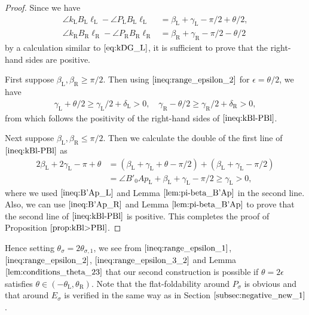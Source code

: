 \documentclass[11pt]{amsart}
\numberwithin{equation}{section}
\numberwithin{theorem}{section}
\newcommand{\Lt}{\ensuremath{\mathrm{L}}}
\newcommand{\Rt}{\ensuremath{\mathrm{R}}}
\begin{document}
\begin{proof}
Since we have
\begin{equation}\label{ineq:kBl-PBl}
\begin{aligned}
\angle k_\Lt B_\Lt\ell_\Lt -\angle P_\Lt B_\Lt\ell_\Lt&=\beta_\Lt +\gamma_\Lt -\pi /2+\theta /2,\\
\angle k_\Rt B_\Rt\ell_\Rt -\angle P_\Rt B_\Rt\ell_\Rt&=\beta_\Rt +\gamma_\Rt -\pi /2-\theta /2
\end{aligned}
\end{equation}
by a calculation similar to $\eqref{eq:kDG_L}$, it is sufficient to prove that the right-hand sides are positive.

First suppose $\beta_\Lt ,\beta_\Rt\geqslant\pi /2$.
Then using $\eqref{ineq:range_epsilon_2}$ for $\epsilon =\theta /2$, we have
\begin{align*}
\gamma_\Lt +\theta /2\geqslant\gamma_\Lt /2+\delta_\Lt >0,\quad\gamma_\Rt -\theta /2\geqslant\gamma_\Rt /2+\delta_\Rt >0,
\end{align*}
from which follows the positivity of the right-hand sides of $\eqref{ineq:kBl-PBl}$.

Next suppose $\beta_\Lt ,\beta_\Rt\leqslant\pi /2$.
Then we calculate the double of the first line of $\eqref{ineq:kBl-PBl}$ as
\begin{align*}
2\beta_\Lt +2\gamma_\Lt -\pi +\theta&=(\beta_\Lt +\gamma_\Lt +\theta -\pi /2)+(\beta_\Lt +\gamma_\Lt -\pi /2)\\
&=\angle B'_0Ap_\Lt +\beta_\Lt +\gamma_\Lt -\pi /2\geqslant\gamma_\Lt >0,
\end{align*}
where we used $\eqref{ineq:B'Ap_L}$ and Lemma $\ref{lem:pi-beta_B'Ap}$ in the second line.
Also, we can use $\eqref{ineq:B'Ap_R}$ and Lemma $\ref{lem:pi-beta_B'Ap}$ to prove that the second line of $\eqref{ineq:kBl-PBl}$ is positive.
This completes the proof of Proposition $\ref{prop:kBl>PBl}$.
\end{proof}
Hence setting $\theta_\sigma =2\theta_{\sigma ,1}$, we see from $\eqref{ineq:range_epsilon_1}$, $\eqref{ineq:range_epsilon_2}$, $\eqref{ineq:range_epsilon_3_2}$
and Lemma $\ref{lem:conditions_theta_23}$ that our second construction is possible if $\theta =2\epsilon$ satisfies $\theta\in (-\theta_\Lt ,\theta_\Rt )$.
Note that the flat-foldability around $P_\sigma$ is obvious and that around $E_\sigma$ is verified in the same way as in Section $\ref{subsec:negative_new_1}$.
\end{document}

